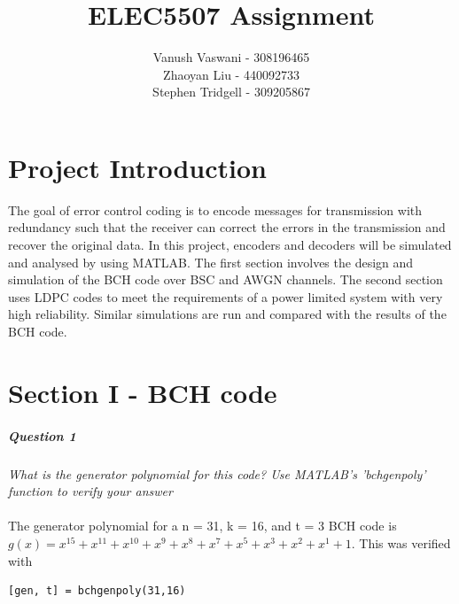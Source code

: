 \documentclass[a4paper]{article}
\begin{document}
\title{ELEC5507 Assignment}
\author{Vanush Vaswani - 308196465 \\
Zhaoyan Liu - 440092733 \\
Stephen Tridgell - 309205867}

\maketitle
\newpage


\lstset{language=Matlab, frame=single, breaklines=true, keepspaces=true, columns=flexible, basicstyle=\ttfamily\footnotesize}
\newpage

\part*{Project Introduction}

The goal of error control coding is to encode messages for transmission with redundancy such that the receiver can correct the errors in the transmission and recover the original data. In this project, encoders and decoders will be simulated and analysed by using MATLAB. The first section involves the design and simulation of the BCH code over BSC and AWGN channels. The second section uses LDPC codes to meet the requirements of a power limited system with very high reliability. Similar simulations are run and compared with the results of the BCH code.

\part*{Section I - BCH code}

\subsubsection{Question 1} \textit{What is the generator polynomial for this code? Use MATLAB’s ’bchgenpoly’ function to verify your answer} \\
\\
The generator polynomial for a n = 31, k = 16, and t = 3 BCH code is $g(x) = x^{15} + x^{11} + 
x^{10} + x^{9} + x^{8} + x^{7} + x^{5} + x^{3} + x^{2} + x^{1} + 1$. 
This was verified with 
\begin{lstlisting}
[gen, t] = bchgenpoly(31,16)
\end{lstlisting}
\end{document}
